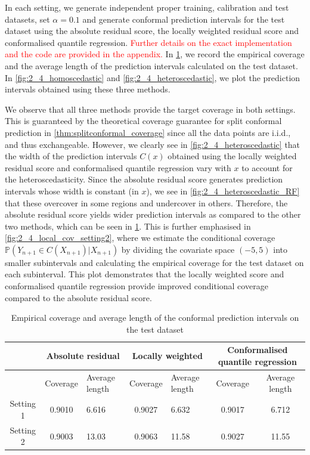\documentclass[11pt, titlepage]{article} %
\newcommand{\Prob}[1]{\mathbb{P}\left( #1 \right)}
\numberwithin{equation}{section}
\theoremstyle{definition}
\numberwithin{theorem}{section}
\numberwithin{lemma}{section}
\numberwithin{corollary}{section}
\numberwithin{proposition}{section}
\numberwithin{definition}{section}
\numberwithin{remark}{section}
\begin{document}
\noindent
In each setting, we generate independent proper training, calibration and test datasets, set \(\alpha = 0.1\) and generate conformal prediction intervals for the test dataset using the absolute residual score, the locally weighted residual score and conformalised quantile regression. \textcolor{red}{Further details on the exact implementation and the code are provided in the appendix.} In \cref{tab:2_4_settings1_2_results}, we record the empirical coverage and the average length of the prediction intervals calculated on the test dataset. In \cref{fig:2_4_homoscedastic} and \cref{fig:2_4_heteroscedastic}, we plot the prediction intervals obtained using these three methods. \vskip5pt

\noindent
We observe that all three methods provide the target coverage in both settings. This is guaranteed by the theoretical coverage guarantee for split conformal prediction in \cref{thm:splitconformal_coverage} since all the data points are i.i.d., and thus exchangeable. However, we clearly see in \cref{fig:2_4_heteroscedastic} that the width of the prediction intervals \(C(x)\) obtained using the locally weighted residual score and conformalised quantile regression vary with \(x\) to account for the heteroscedasticity. Since the absolute residual score generates prediction intervals whose width is constant (in \(x\)), we see in \cref{fig:2_4_heteroscedastic_RF} that these overcover in some regions and undercover in others. Therefore, the absolute residual score yields wider prediction intervals as compared to the other two methods, which can be seen in \cref{tab:2_4_settings1_2_results}. This is further emphasised in \cref{fig:2_4_local_cov_setting2}, where we estimate the conditional coverage \(\Prob{Y_{n+1} \in C(X_{n+1} ) | X_{n+1}}\) by dividing the covariate space \((-5,5)\) into smaller subintervals and calculating the empirical coverage for the test dataset on each subinterval. This plot demonstrates that the locally weighted score and conformalised quantile regression provide improved conditional coverage compared to the absolute residual score.

\begin{table}[h]
    \centering
    \renewcommand{\arraystretch}{1.2}
    \begin{tabular}{|c|c|p{1.5cm}|c|p{1.5cm}|c|c|}
        \hline
        & \multicolumn{2}{c|}{Absolute residual} & \multicolumn{2}{c|}{Locally weighted} & \multicolumn{2}{c|}{Conformalised quantile regression} \\
        \hline
        & Coverage & Average length & Coverage & Average length & Coverage & Average length \\
        \hline
        Setting 1 & 0.9010 & 6.616 & 0.9027 & 6.632 & 0.9017 & 6.712 \\
        Setting 2 & 0.9003 & 13.03 & 0.9063 & 11.58 & 0.9027 & 11.55 \\
        \hline
    \end{tabular}
    \caption{Empirical coverage and average length of the conformal prediction intervals on the test dataset}
    \label{tab:2_4_settings1_2_results}
\end{table}
\end{document}
